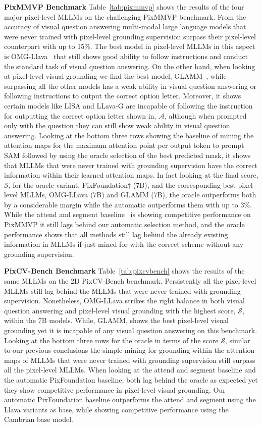 \textbf{PixMMVP Benchmark}
Table~\ref{tab:pixmmvp} shows the results of the four major pixel-level MLLMs on the challenging PixMMVP benchmark. From the accuracy of visual question answering multi-modal large language models that were never trained with pixel-level grounding supervision surpass their pixel-level counterpart with up to 15\%. The best model in pixel-level MLLMs in this aspect is OMG-Llava~\cite{zhang2024omg} that still shows good ability to follow instructions and conduct the standard task of visual question answering. On the other hand, when looking at pixel-level visual grounding we find the best model, GLAMM~\cite{rasheed2024glamm}, while surpassing all the other models has a weak ability in visual question answering or following instructions to output the correct option letter. Moreover, it shows certain models like LISA and LLava-G are incapable of following the instruction for outputting the correct option letter shown in, $\mathcal{A}$, although when prompted only with the question they can still show weak ability in visual question answering. Looking at the bottom three rows showing the baseline of mining the attention maps for the maximum attention point per output token to prompt SAM followed by using the oracle selection of the best predicted mask, it shows that MLLMs that were never trained with grounding supervision have the correct information within their learned attention maps. In fact looking at the final score, $\mathcal{S}$, for the oracle variant, PixFoundation$\dagger$ (7B), and the corresponding best pixel-level MLLMs, OMG-LLava (7B) and GLAMM (7B), the oracle outperforms both by a considerable margin while the automatic outperforms them with up to 3\%. While the attend and segment baseline~\cite{cao2024emerging} is showing competitive performance on PixMMVP it still lags behind our automatic selection method, and the oracle performance shows that all methods still lag behind the already existing information in MLLMs if just mined for with the correct scheme without any grounding supervision.

\textbf{PixCV-Bench Benchmark}
Table~\ref{tab:pixcvbench} shows the results of the same MLLMs on the 2D PixCV-Bench benchmark. Persistently all the pixel-level MLLMs still lag behind the MLLMs that were never trained with grounding supervision. Nonetheless, OMG-LLava strikes the right balance in both visual question answering and pixel-level visual grounding with the highest score, $\mathcal{S}$, within the 7B models. While, GLAMM, shows the best pixel-level visual grounding yet it is incapable of any visual question answering on this benchmark. Looking at the bottom three rows for the oracle in terms of the score $\mathcal{S}$, similar to our previous conclusions the simple mining for grounding within the attention maps of MLLMs that were never trained with grounding supervision still surpass all the pixel-level MLLMs. When looking at the attend and segment baseline and the automatic PixFoundation baseline, both lag behind the oracle as expected yet they show competitive performance in pixel-level visual grounding. Our automatic PixFoundation baseline outperforms the attend and segment using the Llava variants as base, while showing competitive performance using the Cambrian base model.

